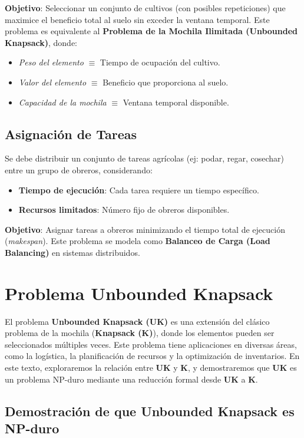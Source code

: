 \documentclass{report}
\begin{document}
	\textbf{Objetivo}: Seleccionar un conjunto de cultivos (con posibles repeticiones) que maximice el beneficio total al suelo sin exceder la ventana temporal. Este problema es equivalente al \textbf{Problema de la Mochila Ilimitada (Unbounded Knapsack)}, donde:
	\begin{itemize}
		\item \textit{Peso del elemento} $\equiv$ Tiempo de ocupación del cultivo.
		\item \textit{Valor del elemento} $\equiv$ Beneficio que proporciona al suelo.
		\item \textit{Capacidad de la mochila} $\equiv$ Ventana temporal disponible.
	\end{itemize}
	
	\section{Asignación de Tareas}
	Se debe distribuir un conjunto de tareas agrícolas (ej: podar, regar, cosechar) entre un grupo de obreros, considerando:
	\begin{itemize}
		\item \textbf{Tiempo de ejecución}: Cada tarea requiere un tiempo específico.
		\item \textbf{Recursos limitados}: Número fijo de obreros disponibles.
	\end{itemize}
	
	\textbf{Objetivo}: Asignar tareas a obreros minimizando el tiempo total de ejecución (\textit{makespan}). Este problema se modela como \textbf{Balanceo de Carga (Load Balancing)} en sistemas distribuidos.
	
	
	\chapter{Problema Unbounded Knapsack}
El problema \textbf{Unbounded Knapsack (UK)} es una extensión del clásico problema de la mochila (\textbf{Knapsack (K)}), donde los elementos pueden ser seleccionados múltiples veces. Este problema tiene aplicaciones en diversas áreas, como la logística, la planificación de recursos y la optimización de inventarios. En este texto, exploraremos la relación entre \textbf{UK} y \textbf{K}, y demostraremos que \textbf{UK} es un problema NP-duro mediante una reducción formal desde \textbf{UK} a \textbf{K}.

\section{Demostración de que Unbounded Knapsack es NP-duro}
\end{document}
